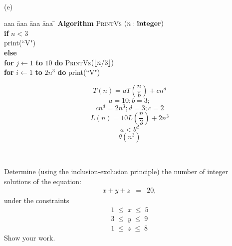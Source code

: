 \documentclass[11pt]{article}
\begin{document}
\begin{problem}
\bigskip
\ 


\bigskip
\noindent
(e)\ \ 
\begin{minipage}[t]{3in}
\begin{tabbing}
aaa \= aaa \= aaa \= aaa \=  \kill
\textbf{Algorithm} \textsc{PrintVs} $(n: \mbox{\bf integer})$ \\
          \> \textbf{if} $n < 3$ \\
          \>\>  print(``V") \\
          \>\textbf{else} \\
          \>\>  \textbf{for} $j \leftarrow 1$ \textbf{to} $10$ 
					\textbf{do} \textsc{PrintVs}$({\left\lfloor n/3\right\rfloor})$\\
      \>\> \textbf{for} $i \leftarrow 1$ \textbf{to} $2n^3$ \textbf{do} print(``V")
\end{tabbing}
\end{minipage}

\begin{solution}
\[ T(n) = aT( \frac{n}{b} ) + cn^{d} \]
\[ a = 10; b = 3; \]
\[ cn^{d} = 2n^{3}; d = 3; c = 2 \]
\[ L(n) = 10L( \frac{n}{3} ) + 2n^{3} \]
\[ a < b^{d} \]
\[ \theta(n^{3}) \]
\end{solution}


\bigskip
\


\end{problem}



\begin{problem}
Determine (using the inclusion-exclusion principle)
the number of integer solutions of the equation:
%
\begin{eqnarray*}
x + y + z &=& 20,
\end{eqnarray*}
%
under the constraints 
%
\begin{eqnarray*}
        1 \;\le\; x \;\le\; 5 \\
        3 \;\le\; y \;\le\; 9 \\
        1\;\le\; z  \;\le\; 8
\end{eqnarray*}
%
Show your work.
\end{problem}
\end{document}
